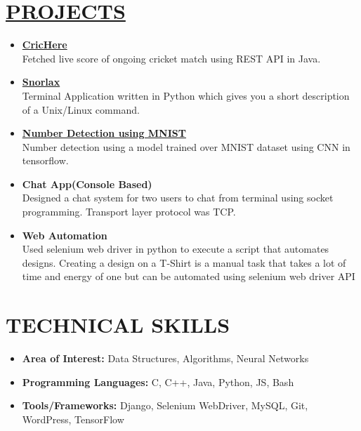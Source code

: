 \documentclass[line, margin, 12pt]{res}
\begin{document}
\begin{resume}
\begin{itemize}
\end{itemize}
\section{\hyperref[https://www.github.com/darshansharma]{PROJECTS}}
\begin{itemize}
\item \textbf{\href{https://github.com/darshansharma/CricHere/blob/master/src/test/Test.java}{CricHere}}\\
Fetched live score of ongoing cricket match using REST API in Java.
\item \textbf{\href{https://github.com/darshansharma/snorlax}{Snorlax}}\\
Terminal Application written in Python which gives you a short description of a Unix/Linux command.
\item \textbf{\href{https://github.com/darshansharma/machine-learning/}{Number Detection using MNIST}}\\
Number detection using a model trained over MNIST dataset using CNN in tensorflow.
\item \textbf{Chat App(Console Based)}\\
Designed a chat system for two users to chat from terminal using socket programming. Transport layer protocol was TCP.
\item \textbf{Web Automation} \\
Used selenium web driver in python to execute a script that automates designs.
Creating a design on a T-Shirt is a manual task that takes a lot of time and energy of one but can be automated using selenium web driver API\\
\end{itemize}

\section{TECHNICAL SKILLS}
\begin{itemize}
\item \textbf{Area of Interest:} Data Structures, Algorithms, Neural Networks
\item \textbf{Programming Languages:} C, C++, Java, Python, JS, Bash
\item \textbf{Tools/Frameworks:} Django, Selenium WebDriver, MySQL, Git, WordPress, TensorFlow\\
\end{itemize}

\end{resume}
\end{document}
